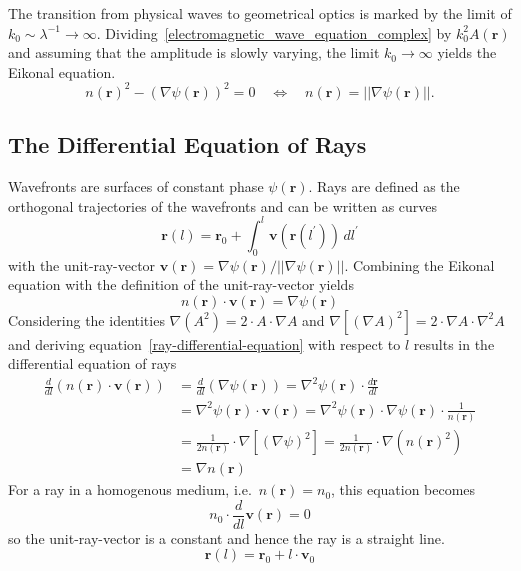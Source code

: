 The transition from physical waves to geometrical optics is marked by the limit of \(k_0 \sim  \lambda^{-1} \rightarrow \infty \).
Dividing~\eqref{electromagnetic_wave_equation_complex} by \(k_0^2 A(\bm{r})\) and assuming that the amplitude is slowly varying, the limit \(k_0 \rightarrow \infty \) yields the Eikonal equation.
\begin{equation}
    {n(\bm{r})}^2 - {(\nabla \psi(\bm{r}))}^2 = 0 \quad \Leftrightarrow \quad n(\bm{r}) = ||\nabla \psi(\bm{r})||.
\end{equation}


\subsection{The Differential Equation of Rays}
Wavefronts are surfaces of constant phase \(\psi(\bm{r})\).
Rays are defined as the orthogonal trajectories of the wavefronts and can be written as curves
\begin{equation}
    \bm{r}(l) = \bm{r}_0 + \int_{0}^{l} \bm{v}(\bm{r}(l^{\prime})) \, dl^{\prime}
\end{equation}
with the unit-ray-vector \(\bm{v}(\bm{r}) = \nabla \psi(\bm{r}) / ||\nabla \psi(\bm{r})||\).
Combining the Eikonal equation with the definition of the unit-ray-vector yields
\begin{equation}\label{ray-differential-equation}
    n(\bm{r}) \cdot \bm{v}(\bm{r}) = \nabla \psi(\bm{r})
\end{equation}
Considering the identities \(\nabla(A^2)= 2 \cdot A \cdot \nabla A\) and \(\nabla[{(\nabla A)}^2] = 2 \cdot \nabla A \cdot \nabla^2 A\) and deriving equation~\eqref{ray-differential-equation} with respect to \(l\) results in the differential equation of rays~\parencite{born_foundations_1999}
\begin{align}
    \frac{d}{dl}(n(\bm{r}) \cdot \bm{v}(\bm{r})) &= \frac{d}{dl}(\nabla \psi(\bm{r})) = \nabla^2 \psi(\bm{r}) \cdot \frac{d\bm{r}}{dl} \nonumber \\
    &= \nabla^2 \psi(\bm{r}) \cdot \bm{v}(\bm{r}) = \nabla^2 \psi(\bm{r}) \cdot \nabla \psi(\bm{r}) \cdot \frac{1}{n(\bm{r})} \nonumber \\
    &= \frac{1}{2n(\bm{r})} \cdot \nabla[{(\nabla \psi)}^2] = \frac{1}{2n(\bm{r})} \cdot \nabla({n(\bm{r})}^2) \nonumber \\
    &= \nabla n(\bm{r})
\end{align}
For a ray in a homogenous medium, i.e.~\(n(\bm{r}) = n_0\), this equation becomes
\begin{equation}
    n_0 \cdot \frac{d}{dl}\bm{v}(\bm{r}) = 0
\end{equation}
so the unit-ray-vector is a constant and hence the ray is a straight line.
\begin{equation}
    \bm{r}(l) = \bm{r}_0 + l \cdot \bm{v}_0
\end{equation}


